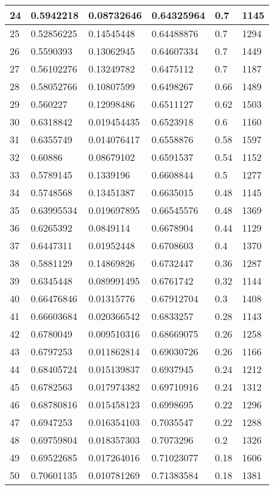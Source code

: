 \begin{longtable}{|l|l|l|l|l|l|}
24 & 0.5942218 & 0.08732646 & 0.64325964 & 0.7 & 1145 \\ \hline 
25 & 0.52856225 & 0.14545448 & 0.64488876 & 0.7 & 1294 \\ \hline 
26 & 0.5590393 & 0.13062945 & 0.64607334 & 0.7 & 1449 \\ \hline 
27 & 0.56102276 & 0.13249782 & 0.6475112 & 0.7 & 1187 \\ \hline 
28 & 0.58052766 & 0.10807599 & 0.6498267 & 0.66 & 1489 \\ \hline 
29 & 0.560227 & 0.12998486 & 0.6511127 & 0.62 & 1503 \\ \hline 
30 & 0.6318842 & 0.019454435 & 0.6523918 & 0.6 & 1160 \\ \hline 
31 & 0.6355749 & 0.014076417 & 0.6558876 & 0.58 & 1597 \\ \hline 
32 & 0.60886 & 0.08679102 & 0.6591537 & 0.54 & 1152 \\ \hline 
33 & 0.5789145 & 0.1339196 & 0.6608844 & 0.5 & 1277 \\ \hline 
34 & 0.5748568 & 0.13451387 & 0.6635015 & 0.48 & 1145 \\ \hline 
35 & 0.63995534 & 0.019697895 & 0.66545576 & 0.48 & 1369 \\ \hline 
36 & 0.6265392 & 0.0849114 & 0.6678904 & 0.44 & 1129 \\ \hline 
37 & 0.6447311 & 0.01952448 & 0.6708603 & 0.4 & 1370 \\ \hline 
38 & 0.5881129 & 0.14869826 & 0.6732447 & 0.36 & 1287 \\ \hline 
39 & 0.6345448 & 0.089991495 & 0.6761742 & 0.32 & 1144 \\ \hline 
40 & 0.66476846 & 0.01315776 & 0.67912704 & 0.3 & 1408 \\ \hline 
41 & 0.66603684 & 0.020366542 & 0.6833257 & 0.28 & 1143 \\ \hline 
42 & 0.6780049 & 0.009510316 & 0.68669075 & 0.26 & 1258 \\ \hline 
43 & 0.6797253 & 0.011862814 & 0.69030726 & 0.26 & 1166 \\ \hline 
44 & 0.68405724 & 0.015139837 & 0.6937945 & 0.24 & 1212 \\ \hline 
45 & 0.6782563 & 0.017974382 & 0.69710916 & 0.24 & 1312 \\ \hline 
46 & 0.68780816 & 0.015458123 & 0.6998695 & 0.22 & 1296 \\ \hline 
47 & 0.6947253 & 0.016354103 & 0.7035547 & 0.22 & 1288 \\ \hline 
48 & 0.69759804 & 0.018357303 & 0.7073296 & 0.2 & 1326 \\ \hline 
49 & 0.69522685 & 0.017264016 & 0.71023077 & 0.18 & 1606 \\ \hline 
50 & 0.70601135 & 0.010781269 & 0.71383584 & 0.18 & 1381 \\ \hline 
\end{longtable}